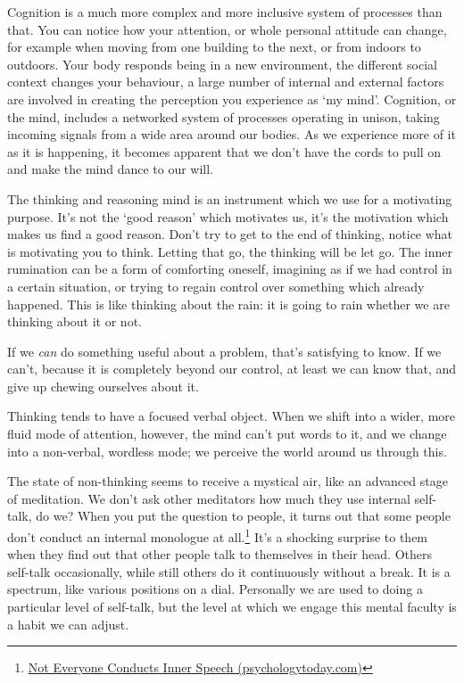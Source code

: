 \enlargethispage*{\baselineskip}

Cognition is a much more complex and more inclusive system of processes
than that. You can notice how your attention, or whole personal attitude
can change, for example when moving from one building to the next, or
from indoors to outdoors. Your body responds being in a new environment,
the different social context changes your behaviour, a large number of
internal and external factors are involved in creating the perception
you experience as `my mind'. Cognition, or the mind, includes a
networked system of processes operating in unison, taking incoming
signals from a wide area around our bodies. As we experience more of it
as it is happening, it becomes apparent that we don't have the cords to
pull on and make the mind dance to our will.

The thinking and reasoning mind is an instrument which we use for a
motivating purpose. It's not the `good reason' which motivates us, it's
the motivation which makes us find a good reason. Don't try to get to
the end of thinking, notice what is motivating you to think. Letting
that go, the thinking will be let go. The inner rumination can be a form
of comforting oneself, imagining as if we had control in a certain
situation, or trying to regain control over something which already
happened. This is like thinking about the rain: it is going to rain
whether we are thinking about it or not.

If we \emph{can} do something useful about a problem, that's satisfying
to know. If we can't, because it is completely beyond our control, at
least we can know that, and give up chewing ourselves about it.

Thinking tends to have a focused verbal object. When we shift into a
wider, more fluid mode of attention, however, the mind can't put words
to it, and we change into a non-verbal, wordless mode; we perceive the
world around us through this.

The state of non-thinking seems to receive a mystical air, like an
advanced stage of meditation. We don't ask other meditators how much
they use internal self-talk, do we? When you put the question to people,
it turns out that some people don't conduct an internal monologue at
all.\footnote{\href{https://www.psychologytoday.com/us/blog/pristine-inner-experience/201110/not-everyone-conducts-inner-speech}{Not
  Everyone Conducts Inner Speech (psychologytoday.com)}} It's a shocking
surprise to them when they find out that other people talk to themselves
in their head. Others self-talk occasionally, while still others do it
continuously without a break. It is a spectrum, like various positions
on a dial. Personally we are used to doing a particular level of
self-talk, but the level at which we engage this mental faculty is a
habit we can adjust.

